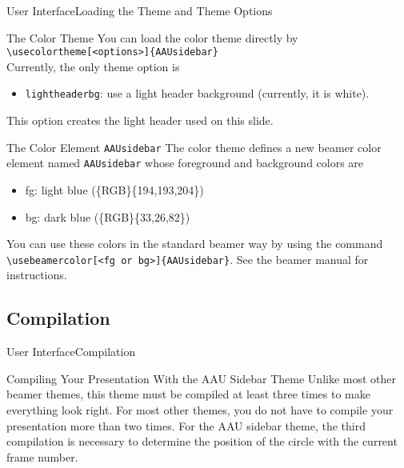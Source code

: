 \documentclass[10pt]{beamer}
\begin{document}
{
\begin{frame}{User Interface}{Loading the Theme and Theme Options}
  \begin{block}{The Color Theme}
    You can load the color theme directly by\\
    {\tt \textbackslash usecolortheme[<options>]\{AAUsidebar\}}\\
    Currently, the only theme option is
    \begin{itemize}
      \item {\tt lightheaderbg}: use a light header background (currently, it is white). 
    \end{itemize}
    This option creates the light header used on this slide.
  \end{block}
  \pause
  \begin{block}{The Color Element {\tt AAUsidebar}}
    The color theme defines a new beamer color element named {\tt AAUsidebar} whose foreground and background colors are
    \begin{itemize}
      \item fg: {light blue (\{RGB\}\{194,193,204\})}
      \item bg: {dark blue (\{RGB\}\{33,26,82\})}
    \end{itemize}
    You can use these colors in the standard beamer way by using the command
    {\tt \textbackslash usebeamercolor[<fg or bg>]\{AAUsidebar\}}. See the beamer manual for instructions.
  \end{block}
\end{frame}
}

\subsection{Compilation}
\begin{frame}{User Interface}{Compilation}
\begin{block}{Compiling Your Presentation With the AAU Sidebar Theme}
  Unlike most other beamer themes, this theme must be compiled at least \alert{three} times to make everything look right. For most other themes, you do not have to compile your presentation more than two times. For the AAU sidebar theme, the third compilation is necessary to determine the position of the circle with the current frame number.
\end{block}
\end{frame}
\end{document}
